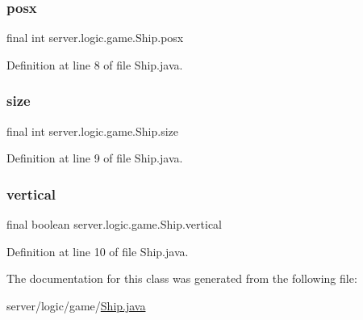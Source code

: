 \subsubsection{\texorpdfstring{posx}{posx}}
{\footnotesize\ttfamily final int server.\+logic.\+game.\+Ship.\+posx}



Definition at line 8 of file Ship.\+java.

\hypertarget{classserver_1_1logic_1_1game_1_1_ship_a55a1cc2a311ddaf3a469c5483b137cbf}{}\label{classserver_1_1logic_1_1game_1_1_ship_a55a1cc2a311ddaf3a469c5483b137cbf} 
\subsubsection{\texorpdfstring{size}{size}}
{\footnotesize\ttfamily final int server.\+logic.\+game.\+Ship.\+size}



Definition at line 9 of file Ship.\+java.

\hypertarget{classserver_1_1logic_1_1game_1_1_ship_aea5b5600ee416202bf8dd935a21fc6be}{}\label{classserver_1_1logic_1_1game_1_1_ship_aea5b5600ee416202bf8dd935a21fc6be} 
\subsubsection{\texorpdfstring{vertical}{vertical}}
{\footnotesize\ttfamily final boolean server.\+logic.\+game.\+Ship.\+vertical}



Definition at line 10 of file Ship.\+java.



The documentation for this class was generated from the following file\+:\begin{DoxyCompactItemize}
\item 
server/logic/game/\hyperlink{_ship_8java}{Ship.\+java}\end{DoxyCompactItemize}
